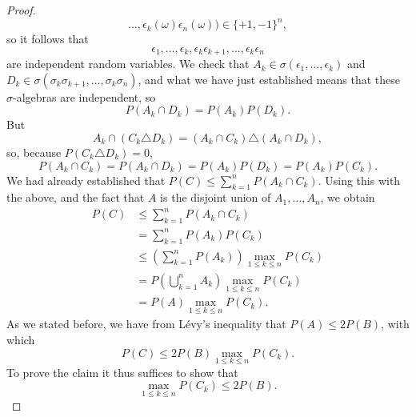 \documentclass{article}
\theoremstyle{definition}
\begin{document}
\begin{proof}
\[\ldots,\epsilon_k(\omega) \epsilon_n(\omega)) \in \{+1,-1\}^n,
\]
so it follows that
\[
\epsilon_1,\ldots,\epsilon_k,
\epsilon_k \epsilon_{k+1},
\ldots,\epsilon_k \epsilon_n
\]
are independent random variables.
We check that $A_k \in \sigma(\epsilon_1,\ldots,\epsilon_k)$ and
$D_k \in \sigma(\sigma_k \sigma_{k+1},\ldots,\sigma_k \sigma_n)$, and what we have just established
means that these  $\sigma$-algebras are
independent, so 
\[
P(A_k \cap D_k) = P(A_k) P(D_k).
\]
But
\[
A_k \cap (C_k \triangle D_k) = (A_k \cap C_k) \triangle (A_k \cap D_k),
\]
so, because $P(C_k \triangle D_k)=0$,
\[
P(A_k \cap C_k) = P(A_k \cap D_k) = P(A_k) P(D_k) = P(A_k) P(C_k).
\]
We had already established that $P(C) \leq \sum_{k=1}^n P(A_k \cap C_k)$. Using this with the above, and the fact that $A$ is the disjoint
union of $A_1,\ldots,A_n$, we obtain
\begin{align*}
P(C)&\leq \sum_{k=1}^n P(A_k \cap C_k)\\
&=\sum_{k=1}^n P(A_k) P(C_k)\\
&\leq \left(\sum_{k=1}^n P(A_k) \right) \max_{1 \leq k \leq n} P(C_k)\\
&=P\left(\bigcup_{k=1}^n A_k \right)  \max_{1 \leq k \leq n} P(C_k)\\
&=P(A)  \max_{1 \leq k \leq n} P(C_k).
\end{align*}
As we stated before, we have from L\'evy's inequality that $P(A) \leq 2P(B)$, with which
\[
P(C) \leq 2P(B) \max_{1 \leq k \leq n} P(C_k).
\]
To prove the claim it thus suffices to show that
\[
\max_{1 \leq k \leq n} P(C_k) \leq 2P(B).
\]


\end{proof}
\end{document}
